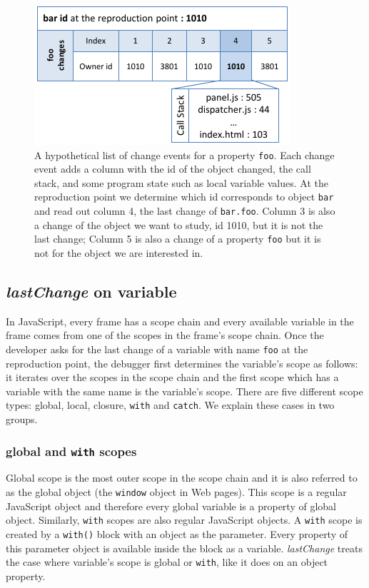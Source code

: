 \documentclass{sig-alternate}
\begin{document}
\begin{figure}[htp]
\centering 
\includegraphics [width=.48\textwidth] {6-foo-changes1.pdf} %
\caption{A hypothetical list of  change events for a property \texttt{foo}. 
Each change event adds a column with the id of the object changed, the call stack,
and some program state such as local variable values. 
At the reproduction point  we determine which id  corresponds to 
object \texttt{bar} and read out column 4,  the last
  change of \texttt{bar.foo}. Column 3 is also a change of
  the object we want to study, id 1010, but it is not the last change;
  Column 5 is also a change of a property \texttt{foo} but it is not for
  the object we are interested in.}
\label{fig:foo-changes1}
\end{figure}

\subsection{{\large\bf\textit{lastChange}} on variable} 
In JavaScript, every frame has a scope chain and every available
variable in the frame comes from one of the scopes in the frame's
scope chain. Once the developer asks for the last change of a variable with name 
\texttt{foo} at the reproduction point, the debugger first determines the
variable's scope as follows: it iterates over the scopes in the scope
chain and the first scope which has a variable with the same name is
the variable's scope. There are five different scope types: global, local,
closure, \texttt{with} and \texttt{catch}. We explain these
cases in two groups.

\subsubsection{global and \texttt{with} scopes}
Global scope is the most outer scope in the scope chain and it is
also referred to as the global object (the \texttt{window}
object in Web pages). This scope is a regular JavaScript object and therefore every
global variable is a property of global object. Similarly,
 \texttt{with} scopes are also regular JavaScript objects. A \texttt{with}
scope is created by a \texttt{with()} block with an object as the
parameter. Every property of this parameter object is available inside the
block as a variable. \textit{lastChange} treats the case where variable's scope
is global or \texttt{with}, like it does on an object
property.
\end{document}
